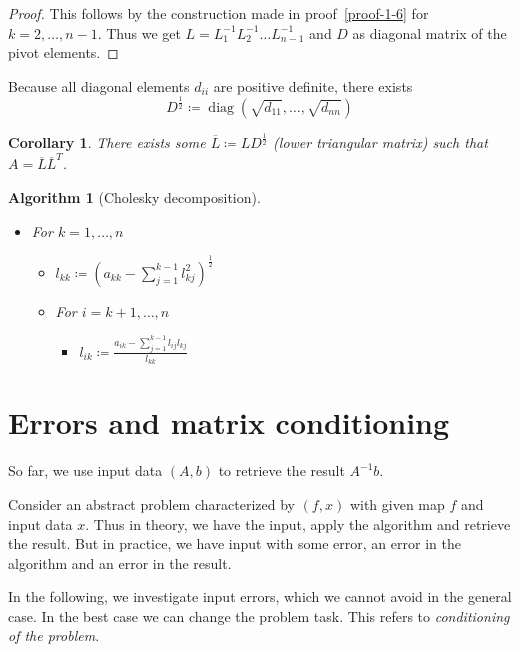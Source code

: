 \documentclass[a4paper]{article}
\newcounter{lecref}[section]
\numberwithin{lecref}{section}
\theoremstyle{break}
\newtheorem{algorithm}{Algorithm}
\newtheorem{corollary}[lecref]{Corollary}
\DeclareMathOperator{\diag}{diag}
\begin{document}
\begin{proof}
  This follows by the construction made in proof~\ref{proof-1-6} for $k=2,\dots,n-1$.
  Thus we get $L = L_1^{-1} L_2^{-1} \dots L_{n-1}^{-1}$ and $D$ as diagonal matrix of the pivot elements.
\end{proof}

Because all diagonal elements $d_{ii}$ are positive definite, there exists
\[ D^{\frac12} \coloneqq \diag\left(\sqrt{d_{11}}, \dots, \sqrt{d_{nn}}\right) \]

\begin{corollary}
  \label{corollary-1-8}
  There exists some $\overline{L} \coloneqq LD^{\frac12}$ (lower triangular matrix) such that $A = \overline{L} \overline{L}^T$.
\end{corollary}

\begin{algorithm}[Cholesky decomposition]\hfill{}
  \begin{itemize}
    \item For $k = 1, \dots, n$
      \begin{itemize}
        \item $l_{kk} \coloneqq (a_{kk} - \sum_{j=1}^{k-1} l_{kj}^2)^{\frac12}$
        \item For $i = k+1, \dots, n$
          \begin{itemize}
            \item $l_{ik} \coloneqq \frac{a_{ik} - \sum_{j=1}^{k-1} l_{ij} l_{kj}}{l_{kk}}$
          \end{itemize}
      \end{itemize}
  \end{itemize}
\end{algorithm}

\section{Errors and matrix conditioning}

So far, we use input data $(A, b)$ to retrieve the result $A^{-1} b$.

Consider an abstract problem characterized by $(f, x)$ with given map $f$ and input data $x$.
Thus in theory, we have the input, apply the algorithm and retrieve the result.
But in practice, we have input with some error, an error in the algorithm and an error in the result.

In the following, we investigate input errors, which we cannot avoid in the general case.
In the best case we can change the problem task. This refers to \emph{conditioning of the problem}.
\end{document}
